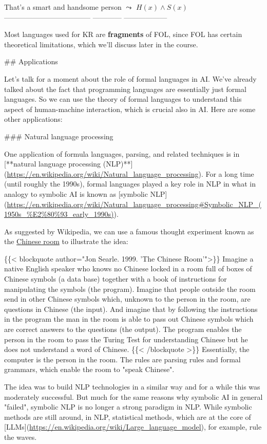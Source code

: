 \documentclass[11pt]{article}
\begin{document}
That's a smart and handsome person    \(\leadsto\)  \(H(x)\land S(x)\)
------------------------------------ ------------ ------------------

Most languages used for KR are \textbf{\textbf{fragments}} of FOL, since FOL has certain
theoretical limitations, which we'll discuss later in the course.

\#\# Applications

Let's talk for a moment about the role of formal languages in AI. We've already
talked about the fact that programming languages are essentially just formal
languages. So we can use the theory of formal languages to understand this
aspect of human-machine interaction, which is crucial also in AI. Here are some
other applications:

\#\#\# Natural language processing

One application of formula languages, parsing, and related techniques is in
[**natural language processing
(NLP)**](\url{https://en.wikipedia.org/wiki/Natural\_language\_processing}). For a long
time (until roughly the 1990s), formal languages played a key role in NLP in
what in analogy to symbolic AI is known as [symbolic
NLP](\url{https://en.wikipedia.org/wiki/Natural\_language\_processing\#Symbolic\_NLP\_(1950s\_\%E2\%80\%93\_early\_1990s)}).

As suggested by Wikipedia, we can use a famous thought experiment known as the
\uline{Chinese room} to illustrate the idea:

\{\{< blockquote author="Jon Searle. 1999. 'The Chinese Room'">\}\}
Imagine a native English speaker who knows no Chinese locked in a room full of boxes of Chinese symbols (a data base) together with a book of instructions for manipulating the symbols (the program). Imagine that people outside the room send in other Chinese symbols which, unknown to the person in the room, are questions in Chinese (the input). And imagine that by following the instructions in the program the man in the room is able to pass out Chinese symbols which are correct answers to the questions (the output). The program enables the person in the room to pass the Turing Test for understanding Chinese but he does not understand a word of Chinese. 
\{\{< /blockquote >\}\}
Essentially, the computer is the person in the room. The rules are parsing rules
and formal grammars, which enable the room to "speak Chinese".

The idea was to build NLP technologies in a similar way and for a while this was
moderately successful. But much for the same reasons why symbolic AI in general
"failed", symbolic NLP is   no longer a strong paradigm in NLP.  While symbolic
methods are still around, in NLP, statistical methods, which are at the core of
[LLMs](\url{https://en.wikipedia.org/wiki/Large\_language\_model}), for example, rule
the waves.
\end{document}
